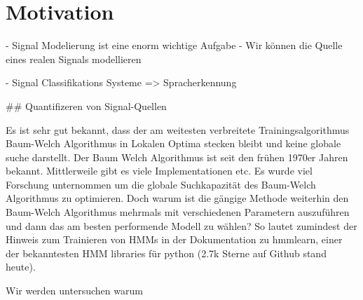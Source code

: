 \section{Motivation}

- Signal Modelierung ist eine enorm wichtige Aufgabe
- Wir können die Quelle eines realen Signals modellieren

- Signal Classifikations Systeme => Spracherkennung


## Quantifizeren von Signal-Quellen

Es ist sehr gut bekannt, dass der am weitesten verbreitete Trainingsalgorithmus Baum-Welch Algorithmus in Lokalen Optima stecken bleibt und keine globale suche darstellt. Der Baum Welch Algorithmus ist seit den frühen 1970er Jahren bekannt. Mittlerweile gibt es viele Implementationen etc. Es wurde viel Forschung unternommen um die globale Suchkapazität des Baum-Welch Algorithmus zu optimieren. Doch warum ist die gängige Methode weiterhin den Baum-Welch Algorithmus mehrmals mit verschiedenen Parametern auszuführen und dann das am besten performende Modell zu wählen? So lautet zumindest der Hinweis zum Trainieren von HMMs in der Dokumentation zu hmmlearn, einer der bekanntesten HMM libraries für python (2.7k Sterne auf Github stand heute).

Wir werden untersuchen warum 
